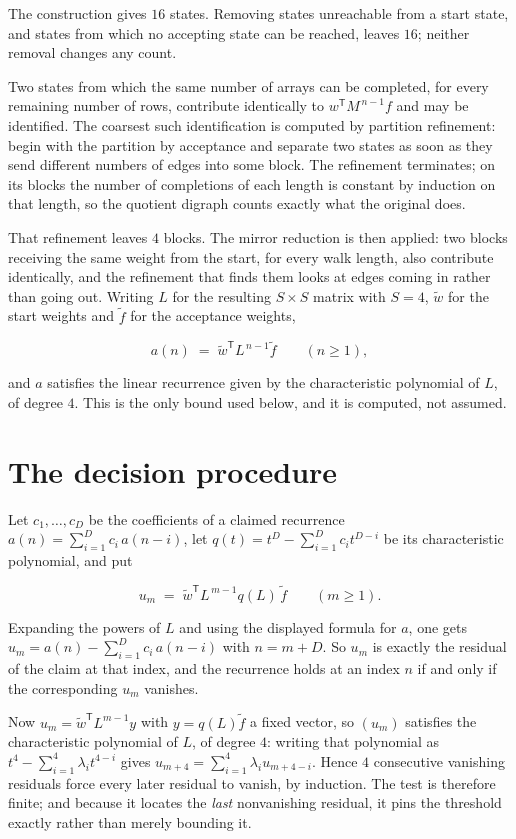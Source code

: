 \documentclass[11pt]{article}
\theoremstyle{definition}
\begin{document}
The construction gives $16$ states. Removing states unreachable from a start state, and states from which no accepting state can be reached, leaves $16$; neither removal changes any count.

Two states from which the same number of arrays can be completed, for every remaining number of rows, contribute identically to $w^{\mathsf T}M^{\,n-1}f$ and may be identified. The coarsest such identification is computed by partition refinement: begin with the partition by acceptance and separate two states as soon as they send different numbers of edges into some block. The refinement terminates; on its blocks the number of completions of each length is constant by induction on that length, so the quotient digraph counts exactly what the original does.

That refinement leaves $4$ blocks. The mirror reduction is then applied: two blocks receiving the same weight from the start, for every walk length, also contribute identically, and the refinement that finds them looks at edges coming in rather than going out. Writing $L$ for the resulting $S \times S$ matrix with $S = 4$, $\tilde w$ for the start weights and $\tilde f$ for the acceptance weights,

\[a(n) \;=\; \tilde w^{\mathsf T} L^{\,n-1} \tilde f \qquad (n \ge 1),\]

and $a$ satisfies the linear recurrence given by the characteristic polynomial of $L$, of degree $4$. This is the only bound used below, and it is computed, not assumed.

\section{The decision procedure}

Let $c_1,\dots,c_D$ be the coefficients of a claimed recurrence $a(n) = \sum_{i=1}^{D} c_i\,a(n-i)$, let $q(t) = t^{D} - \sum_{i=1}^{D} c_i t^{D-i}$ be its characteristic polynomial, and put

\[u_m \;=\; \tilde w^{\mathsf T} L^{\,m-1} q(L)\,\tilde f \qquad (m \ge 1).\]

Expanding the powers of $L$ and using the displayed formula for $a$, one gets $u_m = a(n) - \sum_{i=1}^{D} c_i\,a(n-i)$ with $n = m + D$. So $u_m$ is exactly the residual of the claim at that index, and the recurrence holds at an index $n$ if and only if the corresponding $u_m$ vanishes.

Now $u_m = \tilde w^{\mathsf T} L^{m-1} y$ with $y = q(L)\tilde f$ a fixed vector, so $(u_m)$ satisfies the characteristic polynomial of $L$, of degree $4$: writing that polynomial as $t^{4} - \sum_{i=1}^{4} \lambda_i t^{4-i}$ gives $u_{m+4} = \sum_{i=1}^{4} \lambda_i u_{m+4-i}$. Hence $4$ consecutive vanishing residuals force every later residual to vanish, by induction. The test is therefore finite; and because it locates the {\itshape last} nonvanishing residual, it pins the threshold exactly rather than merely bounding it.
\end{document}
